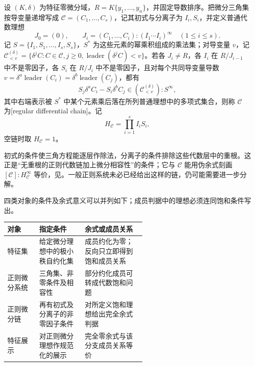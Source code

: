\begin{definition}\label{b3:def:regular-differential-chain}
	设 \((K,\delta)\) 为特征零微分域，\(R=K\{y_1,\ldots,y_n\}\)，并固定导数排序。把微分三角集按导变量递增写成 \(\mathcal C=(C_1,\ldots,C_s)\)，记其初式与分离子为 \(I_i,S_i\)，并定义普通代数理想
	\[
		J_0=(0),\qquad J_i=(C_1,\ldots,C_i):(I_1\cdots I_i)^\infty \quad(1\le i\le s).
	\]
	记 \(S=\{I_1,S_1,\ldots,I_s,S_s\}\)，\(S^*\) 为这些元素的幂乘积组成的乘法集；对导变量 \(v\)，记 \(\mathcal C_{<v}^{(\delta)}=\{\delta^jC:C\in\mathcal C,j\ge0,\operatorname{leader}(\delta^jC)<v\}\)。若各 \(J_i\ne R\)，各 \(I_i\) 在 \(R/J_{i-1}\) 中不是零因子，各 \(S_i\) 在 \(R/J_i\) 中不是零因子，且对每个共同导变量导数 \(v=\delta^a\operatorname{leader}(C_i)=\delta^b\operatorname{leader}(C_j)\)，都有
	\[
		S_j\delta^aC_i-S_i\delta^bC_j
		\in(\mathcal C_{<v}^{(\delta)}):S^\infty,
	\]
	其中右端表示被 \(S^*\) 中某个元素乘后落在所列普通理想中的多项式集合，则称 \(\mathcal C\) 为[regular differential chain]。记
	\[
		H_{\mathcal C}=\prod_{i=1}^sI_iS_i,
	\]
	空链时取 \(H_{\mathcal C}=1\)。
\end{definition}

初式的条件使三角方程能逐层作除法，分离子的条件排除这些代数层中的重根。这正是“无重根的正则代数链加上微分相容性”的条件；它与 \(\mathcal C\) 能用伪余式刻画 \([\mathcal C]:H_{\mathcal C}^\infty\) 等价，见\cite[Section 5.1, Theorem 5.2 and Corollary 5.3]{Hubert2003DifferentialSystems}。一般正则系统未必已经给出这样的链，仍可能需要进一步分解。

四类对象的条件及余式意义可以并列如下；成员判据中的理想必须连同饱和条件写出。
\begin{center}
	\begin{tabularx}{\linewidth}{@{}>{\raggedright\arraybackslash}p{0.23\linewidth}>{\raggedright\arraybackslash}p{0.33\linewidth}X@{}}
		\toprule
		对象 & 指定条件 & 余式或成员关系 \\
		\midrule
		特征集 & 给定微分理想中的极小秩自约化集 & 成员约化为零；反向只立即得到饱和成员关系 \\
		正则微分系统 & 三角集、非零条件及相容性 & 部分约化成员可转成代数饱和问题 \\
		正则微分链 & 再有初式及分离子的非零因子条件 & 对所定义饱和理想给出完全余式判据 \\
		特征展示 & 对正则微分理想作规范化的展示 & 完全零余式与该分支成员关系等价 \\
		\bottomrule
	\end{tabularx}
\end{center}

